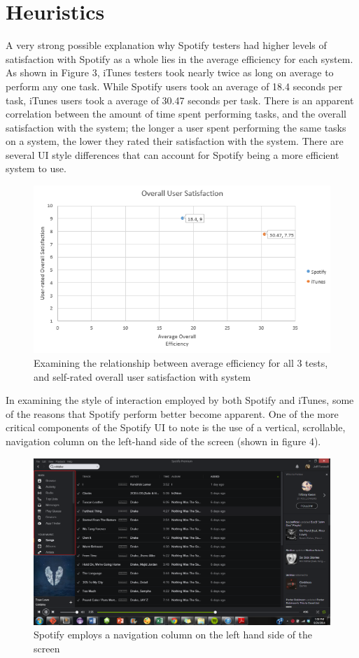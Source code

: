 \documentclass[12pt]{report}
\begin{document}
\section{Heuristics}

A very strong possible explanation why Spotify testers had higher 
levels of satisfaction with Spotify as a whole lies in the average 
efficiency for each system. As shown in Figure 3, iTunes testers 
took nearly twice as long on average to perform any one task. 
While Spotify users took an average of 18.4 seconds per task, 
iTunes users took a average of 30.47 seconds per task. There is an 
apparent correlation between the amount of time spent performing 
tasks, and the overall satisfaction with the system; the longer a 
user spent performing the same tasks on a system, the lower they 
rated their satisfaction with the system. There are several UI 
style differences that can account for Spotify being a more 
efficient system to use.

\begin{figure}[H]
	\centering
	\includegraphics[width=.75\textwidth]{chart3.png}
	\caption{Examining the relationship between average 
efficiency for all 3 tests, and self-rated overall user 
satisfaction with system}
\end{figure}

In examining the style of interaction employed by both Spotify and 
iTunes, some of the reasons that Spotify perform better become 
apparent. One of the more critical components of the Spotify UI to 
note is the use of a vertical, scrollable, navigation column on 
the left-hand side of the screen (shown in figure 4). 

\begin{figure}[H]
	\centering
	\includegraphics[width=\textwidth]{chart4.png}
	\caption{Spotify employs a navigation column on the left 
hand side of the screen}
\end{figure}
\end{document}
